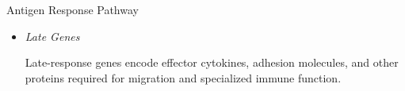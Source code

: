 \begin{core}{Antigen Response Pathway}
\begin{enumerate}[label=(\arabic*)]
\begin{itemize}
\begin{itemize}
                \item TGF-β together with inflammatory cytokines such as IL-6 promotes T$_{\text{H}}$17 differentiation through RORγt; and

                \item TGF-β and IL-2 promote peripheral regulatory T-cell differentiation and FOXP3 expression.

              \end{itemize}

            \item \textit{Late Genes}

              Late-response genes encode effector cytokines, adhesion molecules, and other proteins required for migration and specialized immune function.

          \end{itemize}

      \end{enumerate}

    \end{core}

